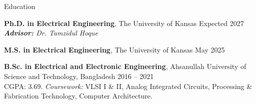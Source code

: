 \begin{rSection}{Education}

{\bf Ph.D. in Electrical Engineering}, The University of Kansas \hfill {Expected 2027}\\
\emph{\textbf{Advisor:} {Dr. Tamzidul Hoque}}

{\bf M.S. in Electrical Engineering}, The University of Kansas \hfill {May 2025}

{\bf B.Sc. in Electrical and Electronic Engineering}, Ahsanullah University of Science and Technology, Bangladesh \hfill {2016 -- 2021}\\
CGPA: 3.69. \emph{Coursework:} VLSI I \& II, Analog Integrated Circuits, Processing \& Fabrication Technology, Computer Architecture.

\end{rSection}
